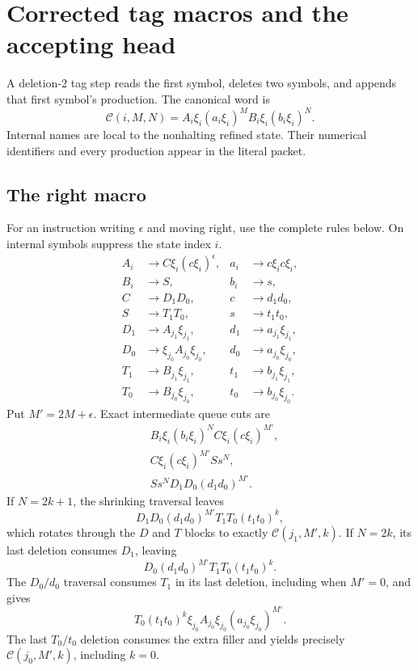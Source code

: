 \documentclass[11pt,letterpaper]{article}
\theoremstyle{definition}\newtheorem{definition}[theorem]{Definition}
\theoremstyle{remark}\newtheorem{remark}[theorem]{Remark}
\begin{document}
\section{Corrected tag macros and the accepting head}\label{fup:gp:sec:tag}
A deletion-2 tag step reads the first symbol, deletes two symbols, and appends that first symbol's production. The canonical word is
\[
 \mathcal C(i,M,N)=A_i\xi_i(a_i\xi_i)^M B_i\xi_i(b_i\xi_i)^N.
\]
Internal names are local to the nonhalting refined state. Their numerical identifiers and every production appear in the literal packet.

\subsection{The right macro}
For an instruction writing $\epsilon$ and moving right, use the complete rules below. On internal symbols suppress the state index $i$.
\begin{align*}
 A_i&\to C\xi_i(c\xi_i)^\epsilon,& a_i&\to c\xi_i c\xi_i,\\
 B_i&\to S,&b_i&\to s,\\
 C&\to D_1D_0,&c&\to d_1d_0,\\
 S&\to T_1T_0,&s&\to t_1t_0,\\
 D_1&\to A_{j_1}\xi_{j_1},&d_1&\to a_{j_1}\xi_{j_1},\\
 D_0&\to\xi_{j_0}A_{j_0}\xi_{j_0},&d_0&\to a_{j_0}\xi_{j_0},\\
 T_1&\to B_{j_1}\xi_{j_1},&t_1&\to b_{j_1}\xi_{j_1},\\
 T_0&\to B_{j_0}\xi_{j_0},&t_0&\to b_{j_0}\xi_{j_0}.
\end{align*}
Put $M'=2M+\epsilon$. Exact intermediate queue cuts are
\begin{align*}
 &B_i\xi_i(b_i\xi_i)^N C\xi_i(c\xi_i)^{M'},\\
 &C\xi_i(c\xi_i)^{M'}S s^N,\\
 &S s^N D_1D_0(d_1d_0)^{M'}.
\end{align*}
If $N=2k+1$, the shrinking traversal leaves
\[
 D_1D_0(d_1d_0)^{M'}T_1T_0(t_1t_0)^k,
\]
which rotates through the $D$ and $T$ blocks to exactly $\mathcal C(j_1,M',k)$.
If $N=2k$, its last deletion consumes $D_1$, leaving
\[
 D_0(d_1d_0)^{M'}T_1T_0(t_1t_0)^k.
\]
The $D_0/d_0$ traversal consumes $T_1$ in its last deletion, including when $M'=0$, and gives
\[
 T_0(t_1t_0)^k\xi_{j_0}A_{j_0}\xi_{j_0}(a_{j_0}\xi_{j_0})^{M'}.
\]
The last $T_0/t_0$ deletion consumes the extra filler and yields precisely $\mathcal C(j_0,M',k)$, including $k=0$.
\end{document}
